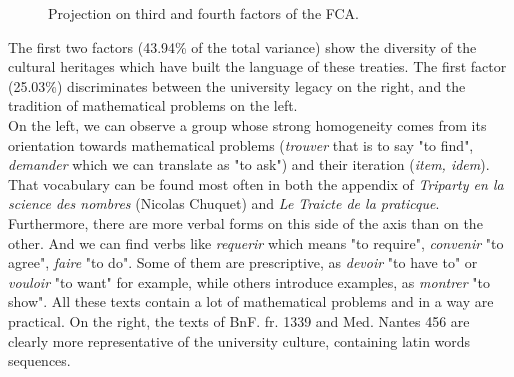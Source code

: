 \documentclass[preprint]{elsarticle}
\begin{document}
\begin{figure}[h!]

\caption{Projection on third and fourth factors of the FCA.}
\label{fig:CA34}
\end{figure}

The first two factors (43.94\% of the total variance) show the diversity of the cultural heritages which have built  the language of these treaties. The first factor (25.03\%) discriminates between the university legacy on the right, and the tradition of mathematical problems on the left.\\

On the left, we can observe a group whose strong homogeneity comes from its orientation towards mathematical problems (\textit{trouver} that is to say "to find", \textit{demander} which we can translate as "to ask") and their iteration (\textit{item, idem}). That vocabulary can be found most often in both the appendix of \textit{Triparty en la science des nombres} (Nicolas Chuquet) and \textit{Le Traicte de la praticque}. Furthermore, there are more verbal forms on this side of the axis than on the other. And we can find verbs like \textit{requerir} which means "to require", \textit{convenir} "to agree", \textit{faire} "to do". Some of them are prescriptive, as \textit{devoir} "to have to" or \textit{vouloir} "to want" for example, while others introduce examples, as \textit{montrer} "to show". All these texts contain a lot of mathematical problems and in a way are practical. On the right, the texts of BnF. fr. 1339 and Med. Nantes 456 are clearly more representative of the university culture, containing latin words sequences.\\
\end{document}
